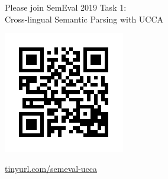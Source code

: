 \documentclass[a0,portrait]{a0poster}
\begin{document}
\begin{multicols}{2}
\begin{multicols}{2}
\color{Black}
\begin{adjustbox}{margin=3mm,frame,minipage=\columnwidth}
\centering\large
Please join SemEval 2019 Task 1: \\
Cross-lingual Semantic Parsing with UCCA

\begin{minipage}{.3\textwidth}\includegraphics[width=\textwidth]{qr}\end{minipage}
\hfill
\begin{minipage}{.6\textwidth}\Large\url{tinyurl.com/semeval-ucca}\end{minipage}
\end{adjustbox}
\end{multicols}

\end{multicols}
\end{document}
